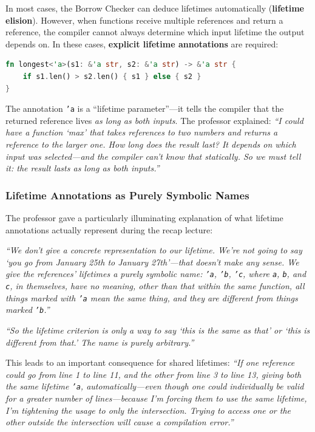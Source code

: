 In most cases, the Borrow Checker can deduce lifetimes automatically (\textbf{lifetime elision}). However, when functions receive multiple references and return a reference, the compiler cannot always determine which input lifetime the output depends on. In these cases, \textbf{explicit lifetime annotations} are required:

\begin{lstlisting}[language=Rust]
fn longest<'a>(s1: &'a str, s2: &'a str) -> &'a str {
    if s1.len() > s2.len() { s1 } else { s2 }
}
\end{lstlisting}

The annotation \texttt{'a} is a ``lifetime parameter''---it tells the compiler that the returned reference lives \emph{as long as both inputs}. The professor explained: \emph{``I could have a function `max' that takes references to two numbers and returns a reference to the larger one. How long does the result last? It depends on which input was selected---and the compiler can't know that statically. So we must tell it: the result lasts as long as both inputs.''}

\subsubsection{Lifetime Annotations as Purely Symbolic Names}

The professor gave a particularly illuminating explanation of what lifetime annotations actually represent during the recap lecture:

\emph{``We don't give a concrete representation to our lifetime. We're not going to say `you go from January 25th to January 27th'---that doesn't make any sense. We give the references' lifetimes a purely symbolic name: \texttt{'a}, \texttt{'b}, \texttt{'c}, where \texttt{a}, \texttt{b}, and \texttt{c}, in themselves, have no meaning, other than that within the same function, all things marked with \texttt{'a} mean the same thing, and they are different from things marked \texttt{'b}.''}

\emph{``So the lifetime criterion is only a way to say `this is the same as that' or `this is different from that.' The name is purely arbitrary.''}

This leads to an important consequence for shared lifetimes: \emph{``If one reference could go from line 1 to line 11, and the other from line 3 to line 13, giving both the same lifetime \texttt{'a}, automatically---even though one could individually be valid for a greater number of lines---because I'm forcing them to use the same lifetime, I'm tightening the usage to only the intersection. Trying to access one or the other outside the intersection will cause a compilation error.''}

